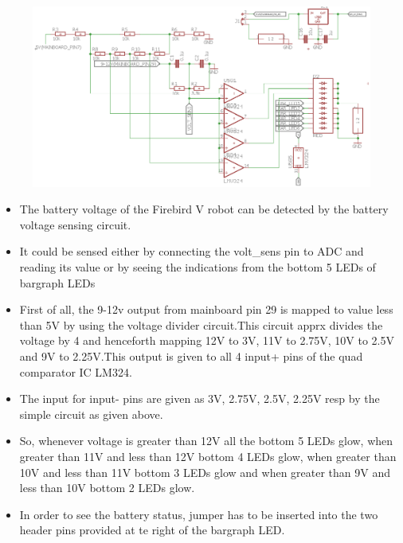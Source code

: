 \documentclass[a4paper,12pt,oneside]{book}
\begin{document}
\section*{\textbf{\fontsize{25}{10}\selectfont{4.Battery voltage indication}}}

\begin{figure}[h]
	\includegraphics[width=1\textwidth]{volt_sens}
\end{figure}
\hfill
\begin{itemize}
	\item{The battery voltage of the Firebird V robot can be detected by the battery voltage sensing circuit.}
	\item{It could be sensed either by connecting the volt\_sens pin to ADC and reading its value or by seeing the indications from the bottom 5 LEDs of bargraph LEDs}
	\item{First of all, the 9-12v output from mainboard pin 29 is mapped to value less than 5V by using the voltage divider circuit.This circuit apprx divides the voltage by 4 and henceforth mapping 12V to 3V, 11V to 2.75V, 10V to 2.5V and 9V to 2.25V.This output is given to all 4 input+ pins of the quad comparator IC LM324.}
	\item{The input for input- pins are given as 3V, 2.75V, 2.5V, 2.25V resp by the simple circuit as given above.}
	\item{So, whenever voltage is greater than 12V all the bottom 5 LEDs glow, when greater than 11V and less than 12V bottom 4 LEDs glow, when greater than 10V and less than 11V bottom 3 LEDs glow and when greater than 9V and less than 10V bottom 2 LEDs glow.}
	\item {In order to see the battery status, jumper has to be inserted into the two header pins provided at te right of the bargraph LED.}
\end{itemize}
\pagebreak
\end{document}
